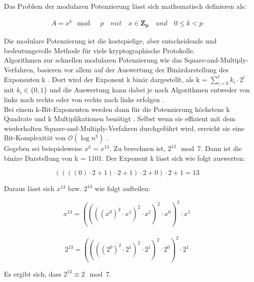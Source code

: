 Das Problem der modularen Potenzierung lässt sich mathematisch definieren als:
\begin{ceqn}

\begin{align*}
   A = x^k \mod \quad p \quad mit \quad x \in \mathbf{Z_p} \quad und \quad 0 \leq k < p
\end{align*}

\end{ceqn}

Die modulare Potenzierung ist die kostspielige, aber
entscheidende und bedeutungsvolle Methode für viele kryptographische Protokolle. \\

Algorithmen zur schnellen modularen Potenzierung wie das Square-and-Multiply-Verfahren, basieren vor
allem auf der Auswertung der Binärdarstellung des Exponenten k \cite{langMEI}. 
Dort wird der Exponent k binär dargestellt, als k = \(\sum_{i=0}^{t} k_i \cdot 2^i\) mit $ k_i \in \{0, 1\}$ und die Auswertung kann dabei je nach Algorithmen entweder von links nach rechts oder von rechts nach links erfolgen \cite{langMEI}. \\

Bei einem k-Bit-Exponenten werden dann für die Potenzierung höchstens k Quadrate und k Multiplikationen benötigt \cite{langMEI}.
Selbst wenn sie effizient mit dem wiederholten Square-and-Multiply-Verfahren durchgeführt wird, erreicht sie eine Bit-Komplexität von $\mathcal{O}(\log{}n^3)$ \cite{menezes:1997}.  \\

Gegeben sei beispielsweise \(x^k = x^{13}\). Zu berechnen ist, \( 2^{13} \mod 7\).
Dann ist die binäre Darstellung von k = 1101. Der Exponent k lässt sich wie folgt auswerten:
\begin{ceqn}
  \[((((0) \cdot 2 + 1) \cdot 2 + 1) \cdot 2 + 0) \cdot 2 + 1   =   13 \]
\end{ceqn}

Daraus lässt sich $ x^{13} $ bzw. $ 2^{13}$ wie folgt aufteilen:\\
\begin{ceqn}
   \[ x^{13} = ((((x^0)^2 \cdot x^1)^2 \cdot x^1)^2 \cdot x^0)^2 \cdot x^1 \] \\
   \[ 2^{13} = ((((2^0)^2 \cdot 2^1)^2 \cdot 2^1)^2 \cdot 2^0)^2 \cdot 2^1 \] 
\end{ceqn}

Es ergibt sich, dass \( 2^{13} \equiv 2 \mod 7\).\\

